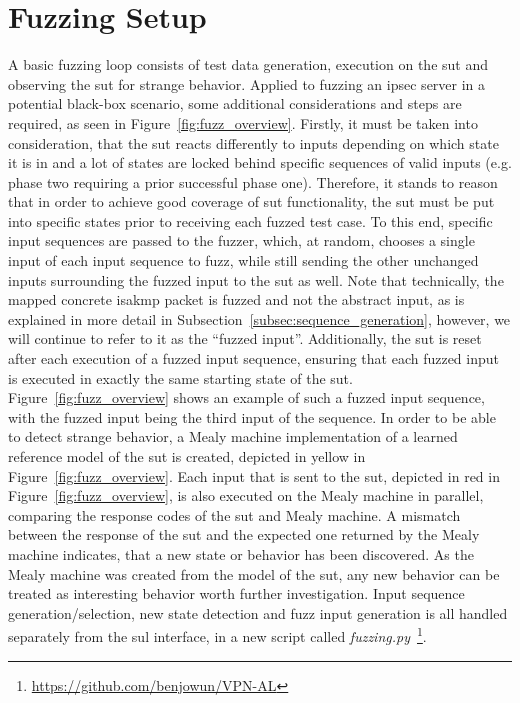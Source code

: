 \section{Fuzzing Setup} \label{sec:fuzz_intro}
A basic fuzzing loop consists of test data generation, execution on the \ac{sut} and observing the \ac{sut} for strange behavior. Applied to fuzzing an \ac{ipsec} server in a potential black-box scenario, some additional considerations and steps are required, as seen in Figure~\ref{fig:fuzz_overview}. Firstly, it must be taken into consideration, that the \ac{sut} reacts differently to inputs depending on which state it is in and a lot of states are locked behind specific sequences of valid inputs (e.g. phase two requiring a prior successful phase one). Therefore, it stands to reason that in order to achieve good coverage of \ac{sut} functionality, the \ac{sut} must be put into specific states prior to receiving each fuzzed test case. To this end, specific input sequences are passed to the fuzzer, which, at random, chooses a single input of each input sequence to fuzz, while still sending the other unchanged inputs surrounding the fuzzed input to the \ac{sut} as well.
Note that technically, the mapped concrete \ac{isakmp} packet is fuzzed and not the abstract input, as is explained in more detail in Subsection~\ref{subsec:sequence_generation}, however, we will continue to refer to it as the ``fuzzed input''.
Additionally, the \ac{sut} is reset after each execution of a fuzzed input sequence, ensuring that each fuzzed input is executed in exactly the same starting state of the \ac{sut}. Figure~\ref{fig:fuzz_overview} shows an example of such a fuzzed input sequence, with the fuzzed input being the third input of the sequence. In order to be able to detect strange behavior, a Mealy machine implementation of a learned reference model of the \ac{sut} is created, depicted in yellow in Figure~\ref{fig:fuzz_overview}. Each input that is sent to the \ac{sut}, depicted in red in Figure~\ref{fig:fuzz_overview}, is also executed on the Mealy machine in parallel, comparing the response codes of the \ac{sut} and Mealy machine. A mismatch between the response of the \ac{sut} and the expected one returned by the Mealy machine indicates, that a new state or behavior has been discovered. As the Mealy machine was created from the model of the \ac{sut}, any new behavior can be treated as interesting behavior worth further investigation. Input sequence generation/selection, new state detection and fuzz input generation is all handled separately from the \ac{sul} interface, in a new script called \emph{fuzzing.py}~\footnote{\url{https://github.com/benjowun/VPN-AL}}.

